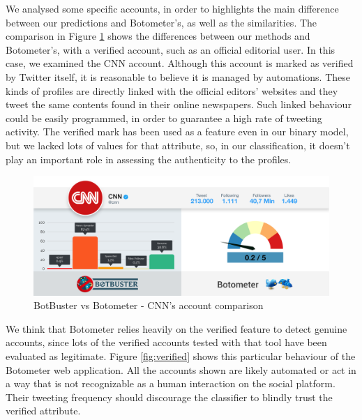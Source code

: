We analysed some specific accounts, in order to highlights the main difference between our predictions and Botometer’s, as well as the similarities.
The comparison in Figure \ref{fig:cnn} shows the differences between our methods and Botometer’s, with a verified account, such as an official editorial user.
In this case, we examined the CNN account. Although this account is marked as verified by Twitter itself, it is reasonable to believe it is managed by automations. These kinds of profiles are directly linked with the official editors' websites and they tweet the same contents found in their online newspapers. Such linked behaviour could be easily programmed, in order to guarantee a high rate of tweeting activity.
The verified mark has been used as a feature even in our binary model, but we lacked lots of values for that attribute, so, in our classification, it doesn't play an important role in assessing the authenticity to the profiles.
\begin{figure}[htp!]
	\begin{center}
		\includegraphics[width=\columnwidth]{chapter7/figure/cnn.png}\par
	\end{center}
	\caption{BotBuster vs Botometer - CNN's account comparison}
	\label{fig:cnn}
\end{figure}
We think that Botometer relies heavily on the verified feature to detect genuine accounts, since lots of the verified accounts tested with that tool have been evaluated as legitimate. Figure \ref{fig:verified} shows this particular behaviour of the Botometer web application. All the accounts shown are likely automated or act in a way that is not recognizable as a human interaction on the social platform. Their tweeting frequency should discourage the classifier to blindly trust the verified attribute.
